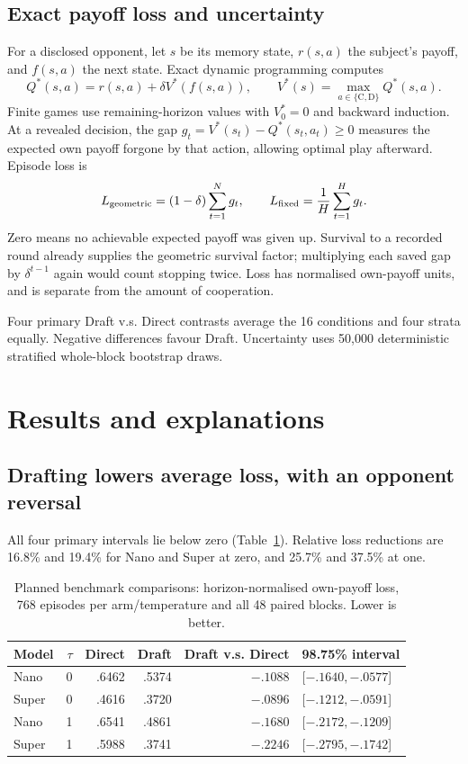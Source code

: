 \documentclass[11pt,a4paper]{article}
\newcommand{\C}{\mathrm C}
\newcommand{\D}{\mathrm D}
\begin{document}
\subsection{Exact payoff loss and uncertainty}
For a disclosed opponent, let $s$ be its memory state, $r(s,a)$ the subject's
payoff, and $f(s,a)$ the next state. Exact dynamic programming computes
\begin{equation}
 Q^*(s,a)=r(s,a)+\delta V^*(f(s,a)),\qquad
 V^*(s)=\max_{a\in\{\C,\D\}}Q^*(s,a).
 \label{eq:bellman}
\end{equation}
Finite games use remaining-horizon values with $V^*_0=0$ and backward induction.
At a revealed decision, the gap $g_t=V^*(s_t)-Q^*(s_t,a_t)\geq0$ measures the
expected own payoff forgone by that action, allowing optimal play afterward.
Episode loss is
\begin{equation}
 L_{\rm geometric}=(1-\delta)\sum_{t=1}^{N}g_t,\qquad
 L_{\rm fixed}=\frac1H\sum_{t=1}^{H}g_t.
 \label{eq:loss}
\end{equation}
Zero means no achievable expected payoff was given up. Survival to a recorded
round already supplies the geometric survival factor; multiplying each saved
gap by $\delta^{t-1}$ again would count stopping twice. Loss has normalised
own-payoff units, and is separate from the amount of cooperation.

Four primary Draft v.s. Direct contrasts average the 16 conditions and four strata
equally. Negative differences favour Draft. Uncertainty uses 50,000 deterministic
stratified whole-block bootstrap draws. 

\section{Results and explanations}
\subsection{Drafting lowers average loss, with an opponent reversal}
All four primary intervals lie below zero (Table~\ref{tab:primary}). Relative
loss reductions are 16.8\% and 19.4\% for Nano and Super at zero, and 25.7\%
and 37.5\% at one. 
\begin{table}[htbp]\centering\small
\begin{tabular}{lrrrrl}
\toprule
Model & $\tau$ & Direct & Draft & Draft v.s. Direct & 98.75\% interval\\
\midrule
Nano & 0 & .6462 & .5374 & $-.1088$ & [$-.1640,-.0577$]\\
Super & 0 & .4616 & .3720 & $-.0896$ & [$-.1212,-.0591$]\\
Nano & 1 & .6541 & .4861 & $-.1680$ & [$-.2172,-.1209$]\\
Super & 1 & .5988 & .3741 & $-.2246$ & [$-.2795,-.1742$]\\
\bottomrule
\end{tabular}
\caption{Planned benchmark comparisons: horizon-normalised own-payoff loss,
768 episodes per arm/temperature and all 48 paired blocks. Lower is better.}
\label{tab:primary}
\end{table}
\end{document}
